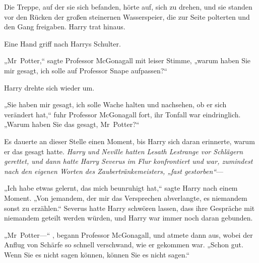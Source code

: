 Die Treppe, auf der sie sich befanden, hörte auf, sich zu drehen, und sie standen vor den Rücken der großen steinernen Wasserspeier, die zur Seite polterten und den Gang freigaben. Harry trat hinaus.

Eine Hand griff nach Harrys Schulter.

„Mr~Potter,“ sagte Professor McGonagall mit leiser Stimme, „warum haben Sie mir gesagt, ich solle auf Professor Snape aufpassen?“

Harry drehte sich wieder um.

„Sie haben mir gesagt, ich solle Wache halten und nachsehen, ob er sich verändert hat,“ fuhr Professor McGonagall fort, ihr Tonfall war eindringlich. „Warum haben Sie das gesagt, Mr~Potter?“

Es dauerte an dieser Stelle einen Moment, bis Harry sich daran erinnerte, warum er das gesagt hatte. \emph{Harry und Neville hatten Lesath Lestrange vor Schlägern gerettet, und dann hatte Harry Severus im Flur konfrontiert und war, zumindest nach den eigenen Worten des Zaubertränkemeisters, „fast gestorben“}—

„Ich habe etwas gelernt, das mich beunruhigt hat,“ sagte Harry nach einem Moment. „Von jemandem, der mir das Versprechen abverlangte, es niemandem sonst zu erzählen.“
Severus hatte Harry schwören lassen, dass ihre Gespräche mit niemandem geteilt werden würden, und Harry war immer noch daran gebunden.

„Mr~Potter—“ , begann Professor McGonagall, und atmete dann aus, wobei der Anflug von Schärfe so schnell verschwand, wie er gekommen war. „Schon gut. Wenn Sie es nicht sagen können, können Sie es nicht sagen.“

